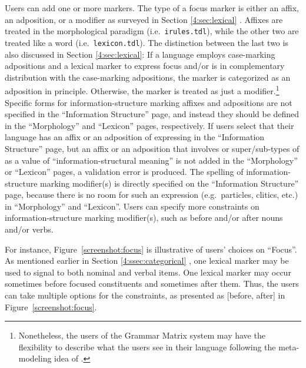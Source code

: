 Users can add one or more  markers. The type
of a focus marker is either an affix, an adposition, or a modifier as
surveyed in Section \ref{4:sec:lexical}
. Affixes are treated in the morphological
paradigm (i.e.\ \texttt{irules.tdl}), while the other two are treated
like a word (i.e.\ \texttt{lexicon.tdl}). The distinction between the
last two is also discussed in Section \ref{4:sec:lexical}:
If a language employs case-marking adpositions and a lexical marker to
express focus and/or  is in complementary distribution with
the case-marking adpositions, the marker is categorized as an
adposition in principle. Otherwise, the marker is treated as just a
modifier.\footnote{Nonetheless, the users of the \lingo Grammar Matrix
  system may have the flexibility to describe what the users see in
  their language following the meta-modeling idea of \citet{poulson:11}.}
Specific forms for information-structure marking affixes and
adpositions are not specified in the ``Information Structure'' page,
and instead they should be defined in the ``Morphology'' and
``Lexicon'' pages, respectively. If users select that their language
has an affix or an adposition of expressing  in the
``Information Structure'' page, but an affix or an adposition that
involves  or super/sub-types of  as a value of
``information-structural meaning'' is not added in the ``Morphology''
or ``Lexicon'' pages, a validation error is produced. The spelling of
information-structure marking modifier(s) is directly specified on the
``Information Structure'' page, because there is no room for such an
expression (e.g.\ particles, clitics, etc.) in ``Morphology'' and
``Lexicon''.  Users can specify more constraints on
information-structure marking modifier(s), such as before and/or after
nouns and/or verbs.





For instance, Figure~\ref{screenshot:focus} is illustrative of users'
choices on ``Focus''. As mentioned earlier in
Section \ref{4:ssec:categorical} , one lexical
marker may be used to signal  to both nominal and verbal
items. One lexical marker may occur sometimes before focused
constituents and sometimes after them. Thus, the users can take
multiple options for the constraints, as presented as [before, after]
in Figure~\ref{screenshot:focus}.



